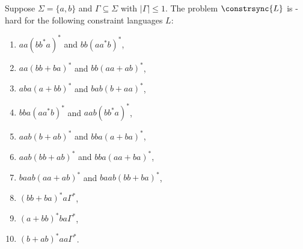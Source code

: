 \begin{proposition}
	\label{constrsync:prop:PSPACE-hard-cases}
Suppose $\Sigma = \{a,b\}$
and $\Gamma \subseteq \Sigma$ with $|\Gamma| \le 1$.
The problem $\constrsync{L}$ is \PSPACE-hard
for the following constraint languages $L$:
\begin{enumerate}
    \item \label{constr_sync:aa:1} $aa(bb^*a)^*$ and $bb(aa^*b)^*$,
    \item \label{constr_sync:aa:2} $aa(bb+ba)^*$ and $bb(aa+ab)^*$,
	\item \label{constr_sync:23:3} $aba(a+bb)^*$ and $bab(b+aa)^*$,
	\item \label{constr_sync:23:4} $bba(aa^*b)^*$ and $aab(bb^*a)^*$,	
	
	\item \label{constr_sync:23:1} $aab(b+ab)^*$ and $bba(a+ba)^*$,
	\item \label{constr_sync:23:2} $aab(bb+ab)^*$ and $bba(aa+ba)^*$,
	
    \item \label{constr_sync:23:5} $baab(aa+ab)^*$ and $baab(bb+ba)^*$,
        
	\item \label{constrsync:Cu:1} $(bb+ba)^*a\Gamma^*$,
	\item \label{constrsync:Cu:2} $(a+bb)^*ba\Gamma^*$,
	\item \label{constrsync:Cu:3} $(b+ab)^*aa\Gamma^*$.
\end{enumerate}
\end{proposition} 
